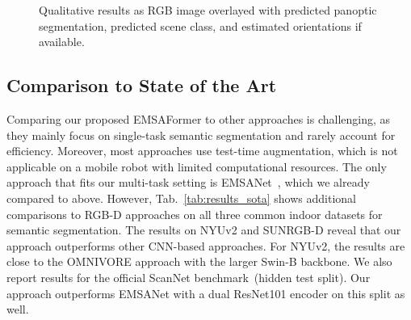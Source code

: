 \documentclass[conference]{IEEEtran}
\begin{document}
\begin{figure}[!b]\centering \vspace{-5mm}\vspace{-4mm}\caption{Qualitative results as RGB image overlayed with predicted panoptic segmentation, predicted scene class, and estimated orientations if available.
    }
    \vspace{-0.5mm}\label{fig:qualitative_results}
\end{figure}


\subsection{Comparison to State of the Art}
\label{sec:experiments:comparison_to_sota}
Comparing our proposed EMSAFormer to other approaches is challenging, as they mainly focus on single-task semantic segmentation and rarely account for efficiency.
Moreover, most approaches use test-time augmentation, which is not applicable on a mobile robot with limited computational resources.
The only approach that fits our multi-task setting is EMSANet~\cite{emsanet2022ijcnn}, which we already compared to above.
However, Tab.~\ref{tab:results_sota} shows additional comparisons to RGB-D approaches on all three common indoor datasets for semantic segmentation.
The results on NYUv2 and SUNRGB-D reveal that our approach outperforms other CNN-based approaches.
For NYUv2, the results are close to the OMNIVORE approach with the larger Swin-B backbone.
We also report results for the official ScanNet benchmark~(hidden test split).
Our approach outperforms EMSANet with a dual ResNet101 encoder on this split as well.
\end{document}
